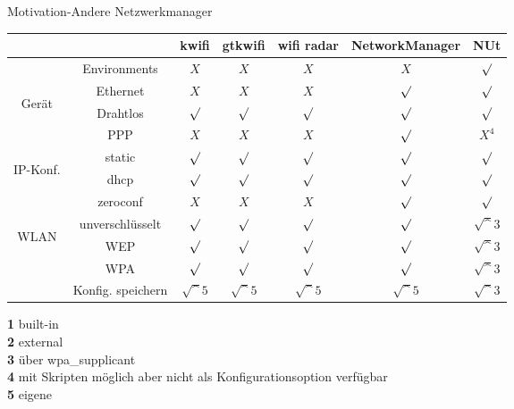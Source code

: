 \begin{frame}[<+-| alert@+>]{Motivation-Andere Netzwerkmanager}
	\fontsize{7}{8.4}\selectfont
	\begin{center}
	\begin{tabular}{cc|c|c|c|c|c}
		&					& kwifi		& gtkwifi	& wifi radar	& NetworkManager	& NUt \\
		\hline
		&Environments		& $X$			& $X$			& $X$			& $X$				& $\surd$ \\
		\hline
		\multirow{3}{*}{\begin{sideways} Gerät \end{sideways}}
		& Ethernet			& $X$			& $X$			& $X$			& $\surd$			& $\surd$ \\
		\cline{2-7}
		& Drahtlos			& $\surd$		& $\surd$		& $\surd$		& $\surd$			& $\surd$ \\
		\cline{2-7}
		& PPP				& $X$			& $X$			& $X$			& $\surd$			& $X^{4}$ \\
		\hline
		\multirow{3}{*}{\begin{sideways} IP-Konf. \end{sideways}}
		&static				& $\surd$		& $\surd$		& $\surd$		& $\surd$			& $\surd$ \\
		\cline{2-7}
		& dhcp				& $\surd$		& $\surd$		& $\surd$		& $\surd$			& $\surd$ \\
		\cline{2-7}
		& zeroconf			& $X$			& $X$			& $X$			& $\surd$			& $\surd$ \\
		\hline
		\multirow{4}{*}{\begin{sideways} WLAN \end{sideways}}
		&unverschlüsselt	& $\surd$		& $\surd$		& $\surd$		& $\surd$			& $\surd^{3}$ \\
		\cline{2-7}
		&WEP				& $\surd$		& $\surd$		& $\surd$		& $\surd$			& $\surd^{3}$ \\
		\cline{2-7}
		&WPA				& $\surd$		& $\surd$		& $\surd$		& $\surd$			& $\surd^{3}$ \\
		\cline{2-7}
		&Konfig. speichern	& $\surd^{5}$	& $\surd^{5}$	& $\surd^{5}$	& $\surd^{5}$		& $\surd^{3}$
	\end{tabular}
	\end{center}
	\textbf{1} built-in\\
	\textbf{2} external\\
	\textbf{3} über wpa\_supplicant\\
	\textbf{4} mit Skripten möglich aber nicht als Konfigurationsoption verfügbar\\
	\textbf{5} eigene \\
\end{frame}

